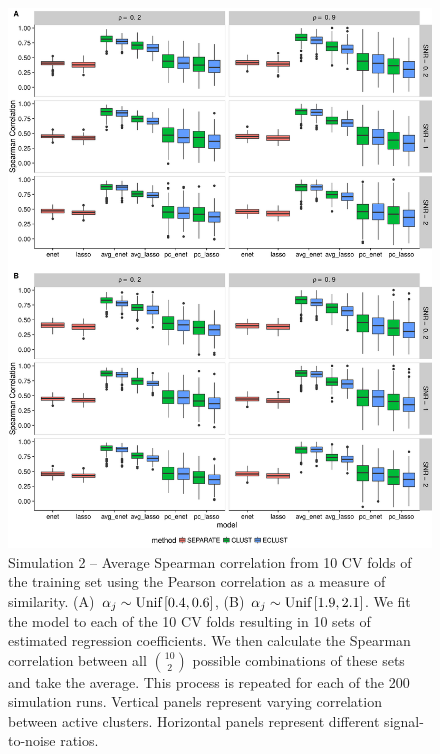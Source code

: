 \begin{figure}[H]
	\centering
	\includegraphics[scale=0.55, keepaspectratio]{./figs/hydra/results/figures/sim2-sept8/spearman_Correlation_sim2.png}
	\caption{Simulation 2 -- Average Spearman correlation from 10 CV folds of the training set using the Pearson correlation as a measure of similarity. \mbox{(A) $\alpha_{j} \sim \textrm{{Unif}}\left[0.4, 0.6\right]$}, \mbox{(B) $\alpha_{j} \sim \textrm{{Unif}}\left[1.9, 2.1\right]$}. We fit the model to each of the 10 CV folds resulting in 10 sets of estimated regression coefficients. We then calculate the Spearman correlation between all $\binom{10}{2}$ possible combinations of these sets and take the average. This process is repeated for each of the 200 simulation runs. Vertical panels represent varying correlation between active clusters. Horizontal panels represent different signal-to-noise ratios.}
	\label{fig:spearman_Correlation_sim2}
\end{figure}


